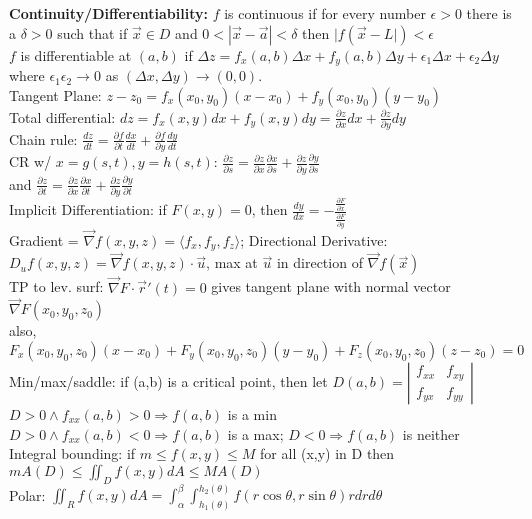 \documentclass[twoside,draft]{article}
\begin{document}
\begin{multicols}{3}
  \textbf{Continuity/Differentiability:}
  $f$ is continuous if for every number $\epsilon > 0$ there is a $\delta > 0$ such that
  if $\vec{x} \in D$ and $0 < |\vec{x}-\vec{a}| < \delta$ then $|f( \vec{x}-L| )< \epsilon$ \\
  $f$ is differentiable at $(a,b)$ if $\Delta z = f_x(a,b) \Delta x + f_y(a,b) \Delta y + \epsilon_1 \Delta x + \epsilon_2 \Delta y$
  where $\epsilon_1 \epsilon_2 \rightarrow 0$ as $(\Delta x, \Delta y) \rightarrow (0,0)$. \\
  Tangent Plane: $z - z_0 = f_x(x_0,y_0)(x-x_0) + f_y(x_0,y_0)(y-y_0)$ \\
  Total differential: $dz = f_x(x,y)dx + f_y(x,y)dy = \frac{\partial z}{\partial x} dx + \frac{\partial z}{\partial y} dy$ \\
  Chain rule: $\frac{dz}{dt} = \frac{\partial f}{\partial t} \frac{dx}{dt} + \frac{\partial f}{\partial y} \frac{dy}{dt}$ \\
  CR w/ $x = g(s,t), y=h(s,t)$: $\frac{\partial z}{\partial s} = \frac{\partial z}{\partial x} \frac{\partial x}{\partial s}
  + \frac{\partial z}{\partial y} \frac{\partial y}{\partial s}$ \\
  and $\frac{\partial z}{\partial t} = \frac{\partial z}{\partial x} \frac{\partial x}{\partial t}
  + \frac{\partial z}{\partial y} \frac{\partial y}{\partial t}$ \\
  Implicit Differentiation: if $F(x,y)=0$, then $\frac{dy}{dx} = -\frac{\frac{\partial F}{\partial x}}{\frac{\partial F}{\partial y}}$ \\
  Gradient = $\vec{\nabla}f(x,y,z) = \langle f_x, f_y, f_z \rangle$;
  Directional Derivative: $D_u f(x,y,z) = \vec{\nabla}f(x,y,z) \cdot \vec{u}$, max at $\vec{u}$ in direction of $\vec{\nabla}f(\vec{x})$ \\
  TP to lev. surf: $\vec{\nabla}F \cdot \vec{r}'(t) = 0$ gives tangent plane with normal vector $\vec{\nabla}F(x_0,y_0,z_0)$ \\
  also, $F_x(x_0,y_0,z_0)(x-x_0) + F_y(x_0,y_0,z_0)(y-y_0) + F_z(x_0,y_0,z_0)(z-z_0) = 0$ \\

  Min/max/saddle: if (a,b) is a critical point, then let $D(a,b) = \left|
    \begin{matrix}
      f_{xx} & f_{xy} \\
      f_{yx} & f_{yy}
    \end{matrix} \right| $ \\
  $D > 0 \wedge f_{xx}(a,b) > 0 \Rightarrow f(a,b)$ is a min \\
  $D > 0 \wedge f_{xx}(a,b) < 0 \Rightarrow f(a,b)$ is a max; $D < 0 \Rightarrow f(a,b)$ is neither \\
  Integral bounding: if $m \leq f(x,y) \leq M$ for all (x,y) in D then $mA(D) \leq \iint_D f(x,y) dA \leq MA(D)$ \\
  Polar: $\iint_Rf(x,y)dA = \int_{\alpha}^{\beta} \int_{h_1(\theta)}^{h_2(\theta)} f(r \cos \theta, r \sin \theta) r dr d\theta$ \\


\end{multicols}
\end{document}
